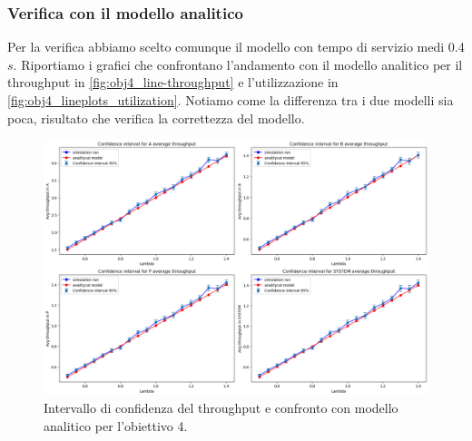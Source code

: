 \subsubsection{Verifica con il modello analitico}
Per la verifica abbiamo scelto comunque il modello con tempo di servizio medi 0.4$s$. Riportiamo i grafici che confrontano l'andamento con il modello analitico per il throughput in \autoref{fig:obj4_line-throughput} e l'utilizzazione in \autoref{fig:obj4_lineplots_utilization}. Notiamo come la differenza tra i due modelli sia poca, risultato che verifica la correttezza del modello.
\begin{figure}
    \centering
    \includegraphics[width=\linewidth]{figs/results/obj4/obj4-line-throughput.png}
    \caption{Intervallo di confidenza del throughput e confronto con modello analitico per l'obiettivo 4.}
    \label{fig:obj4_line-throughput}
\end{figure}
